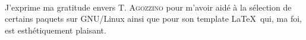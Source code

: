 \thispagestyle{empty}
\begin{flushright}
  \begin{itshape}
    \mbox{~}
    \vfill
    \begin{minipage}{0.65\textwidth}
      J'exprime ma gratitude envers T. \textsc{Agozzino} pour m'avoir aidé à la sélection
de certains paquets sur GNU/Linux ainsi que pour son template \LaTeX  ~qui, ma foi, est esthétiquement plaisant.
    \end{minipage}
  \end{itshape}
\end{flushright}

\setcounter{page}{2}
\thispagestyle{empty}

\newpage 
